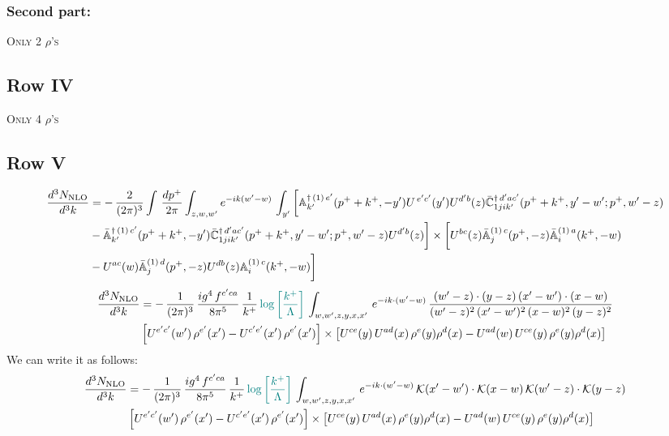 \documentclass[9pt]{article}
\def\mf#1{\mathbb{#1}}
\numberwithin{equation}{section}
\begin{document}
\subsubsection{Second part:}
\textsc{Only 2 $\rho$'s}
\subsection{Row IV}
\textsc{Only 4 $\rho$'s}
\subsection{Row V}
\begin{align}
 \frac{d^{3}N_{\rm NLO}}{d^{3}k} & =   -\,\frac{2}{(2\pi)^{3}} \int\, \frac{dp^{+}}{2\pi}\int_{z,w,w^{\prime}} e^{-ik(w^{\prime}-w)}\,\int_{y^{\prime}}\bigg[\mf{A}^{\dagger\, (1)\,e^{\prime}}_{k^{\prime}}(p^{+}+k^{+},-y^{\prime})U^{\, e^{\prime}c^{\prime}}(y^{\prime})U^{d^{\prime}b}(z) \Bar{\mf{C}}^{\dagger\, d^{\prime}ac^{\prime}}_{1jik^{\prime}}(p^{+}+k^{+},y^{\prime}-w^{\prime}; p^{+},w^{\prime}-z) \notag \\ & -\Bar{\mf{A}}^{\dagger\, (1)\,c^{\prime}}_{k^{\prime}}(p^{+}+k^{+},-y^{\prime}) \Bar{\mf{C}}^{\dagger\, d^{\prime}ac^{\prime}}_{1jik^{\prime}}(p^{+}+k^{+},y^{\prime}-w^{\prime}; p^{+},w^{\prime}-z)U^{d^{\prime}b}(z)\bigg] \times  \bigg[U^{bc}(z)\Bar{\mf{A}}^{(1)\, c}_{j}(p^{+},-z)\Bar{\mf{A}}^{(1)\, a}_{i}(k^{+},-w)\notag \\ & -U^{ac}(w) \Bar{\mf{A}}^{(1)\, d}_{j}(p^{+},-z)U^{db}(z) \mf{A}^{(1)\, c}_{i}(k^{+},- w)\bigg]\nonumber
\end{align}
\begin{align}
 \frac{d^{3}N_{\rm NLO}}{d^{3}k} & =    -\,\frac{1}{(2\pi)^{3}}\, \frac{ig^{4}\,f^{c'ca}}{8\pi^{5}}\, \frac{1}{k^{+}}\,{\color{teal}\log{\left[\frac{k^{+}}{\Lambda}\right]}}\, \int_{w,w',z,y,x,x'}\, e^{-ik\cdot (w'-w)}\,\frac{(w'-z)\cdot (y-z)\,(x'-w')\cdot (x-w)}{(w'-z)^{2}\,(x'-w')^{2}\,(x-w)^{2}\,(y-z)^{2}}\notag \\ & \left[U^{e'c'}(w')\,\rho^{e'}(x')-U^{c'e'}(x')\,\rho^{e'}(x')\right]\times  \left[U^{ce}(y)\,U^{ad}(x)\,\rho^{e}(y)\rho^{d}(x)-U^{ad}(w)\,U^{ce}(y)\,\rho^{e}(y)\rho^{d}(x)\right]
\end{align}
We can write it as follows: 
\begin{align}
 \frac{d^{3}N_{\rm NLO}}{d^{3}k} & =    -\,\frac{1}{(2\pi)^{3}}\, \frac{ig^{4}\,f^{c'ca}}{8\pi^{5}}\, \frac{1}{k^{+}}\,{\color{teal}\log{\left[\frac{k^{+}}{\Lambda}\right]}}\, \int_{w,w',z,y,x,x'}\, e^{-ik\cdot (w'-w)}\,\mathcal{K}(x'-w')\cdot \mathcal{K}(x-w)\,\mathcal{K}(w'-z)\cdot \mathcal{K}(y-z)\notag \\ & \left[U^{e'c'}(w')\,\rho^{e'}(x')-U^{c'e'}(x')\,\rho^{e'}(x')\right]\times  \left[U^{ce}(y)\,U^{ad}(x)\,\rho^{e}(y)\rho^{d}(x)-U^{ad}(w)\,U^{ce}(y)\,\rho^{e}(y)\rho^{d}(x)\right]
\end{align}
\end{document}
